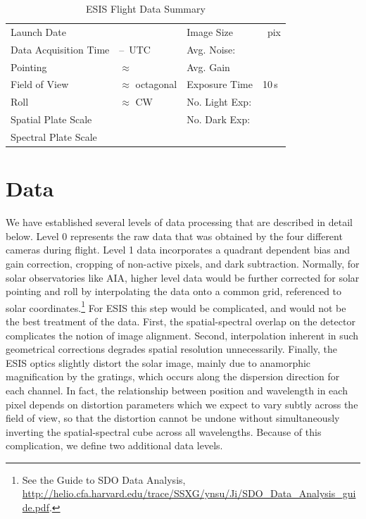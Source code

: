 		\begin{table}
		\begin{center}
			\caption{ESIS Flight Data Summary}
			\label{tab:data_info}
			\begin{tabular}{ll|ll}\hline
				Launch Date & \dateMission & Image Size  & \imageShape~pix\\
				Data Acquisition Time & \timeDataStart--\timeDataStop~UTC & Avg. Noise: & \readoutNoise\tablenotemark{a}\\ 
			    Pointing   &  $\approx$ \esispointing & Avg. Gain &   \gain \\
				Field of View  & $\approx$ \esisfov octagonal  & Exposure Time & 10\,s \\
				Roll & $\approx$ \esisroll CW & No. Light Exp: &\numDataFrames\\
			    Spatial  Plate Scale  &  \plateScale & No. Dark Exp: &\numDarkFrames \\
				Spectral  Plate Scale  &  \dispersion & \\
					\hline
			\end{tabular}
		\end{center}
		\end{table}
		
		



	
\section{Data} 

We have established several levels of data processing that are described in detail below.
Level 0 represents the raw data that was obtained by the four different cameras during flight.
Level 1 data incorporates %
a quadrant dependent bias and gain correction, cropping of non-active pixels, and dark subtraction.
Normally, for solar observatories like AIA, higher level data would be further corrected for solar pointing and roll by interpolating the data onto a common grid, referenced to solar coordinates.\footnote{See the Guide to SDO Data Analysis, \url{http://helio.cfa.harvard.edu/trace/SSXG/ynsu/Ji/SDO_Data_Analysis_guide.pdf}.}  For ESIS this step would be complicated, and would not be the best treatment of the data.  
First, the spatial-spectral overlap on the detector complicates the notion of image alignment. Second, interpolation inherent in such geometrical corrections degrades spatial resolution unnecessarily.  
Finally, the ESIS optics slightly distort the solar image, mainly due to anamorphic magnification by the gratings, which occurs along the dispersion direction for each channel. 
In fact, the relationship between position and wavelength in each pixel depends on distortion parameters which we expect to vary subtly across the field of view, so that the distortion cannot be undone without simultaneously inverting the spatial-spectral cube across all wavelengths.
Because of this complication, we define two additional data levels.  

